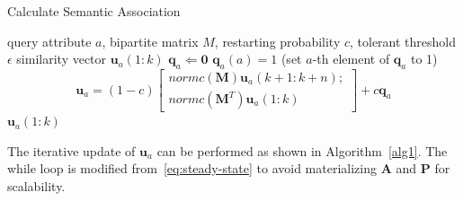 \renewcommand{\algorithmicrequire}{\textbf{Input:}}
\renewcommand{\algorithmicensure}{\textbf{Output:}}
\begin{algorithm}
\caption{Calculate Semantic Association}
\label{alg1}
\begin{algorithmic}
\REQUIRE query attribute $a$, bipartite matrix $M$, restarting probability $c$, tolerant threshold $\epsilon$
\ENSURE similarity vector $\mathbf{u}_a(1:k)$
\STATE $\mathbf{q}_a \Leftarrow \mathbf{0}$
\STATE $\mathbf{q}_a(a)=1$ (set $a$-th element of $\mathbf{q}_a$ to 1)
\STATE \[
    \mathbf{u}_a = (1-c)  \left[ \begin{array}{c}
        normc(\mathbf{M})\mathbf{u}_a(k+1:k+n);\\
        normc(\mathbf{M}^T)\mathbf{u}_a(1:k)
    \end{array} \right] + c\mathbf{q}_a
\]
\ENDWHILE
\RETURN $\mathbf{u}_a(1:k)$
\end{algorithmic}
\end{algorithm}

The iterative update of $\mathbf{u}_a$ can be performed as shown in Algorithm~\ref{alg1}. The while loop is modified from~\ref{eq:steady-state} to avoid materializing $\mathbf{A}$ and $\mathbf{P}$ for scalability. 